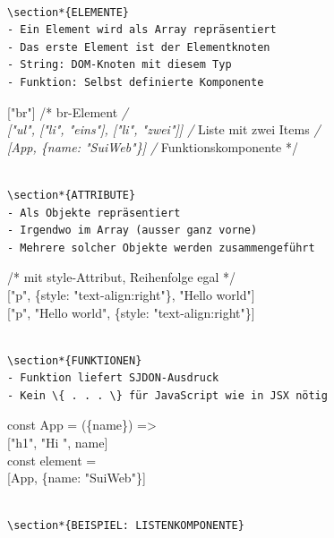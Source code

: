 \begin{verbatim}

\section*{ELEMENTE}
- Ein Element wird als Array repräsentiert
- Das erste Element ist der Elementknoten
- String: DOM-Knoten mit diesem Typ
- Funktion: Selbst definierte Komponente
\end{verbatim}

["br"] /* br-Element \textit{/\\[0pt]
["ul", ["li", "eins"], ["li", "zwei"]] /} Liste mit zwei Items \textit{/\\[0pt]
[App, \{name: "SuiWeb"\}] /} Funktionskomponente */

\begin{verbatim}

\section*{ATTRIBUTE}
- Als Objekte repräsentiert
- Irgendwo im Array (ausser ganz vorne)
- Mehrere solcher Objekte werden zusammengeführt
\end{verbatim}

/* mit style-Attribut, Reihenfolge egal */\\[0pt]
["p", \{style: "text-align:right"\}, "Hello world"]\\[0pt]
["p", "Hello world", \{style: "text-align:right"\}]

\begin{verbatim}

\section*{FUNKTIONEN}
- Funktion liefert SJDON-Ausdruck
- Kein \{ . . . \} für JavaScript wie in JSX nötig
\end{verbatim}

const App = (\{name\}) =>\\[0pt]
["h1", "Hi ", name]\\
const element =\\[0pt]
[App, \{name: "SuiWeb"\}]

\begin{verbatim}

\section*{BEISPIEL: LISTENKOMPONENTE}
\end{verbatim}

